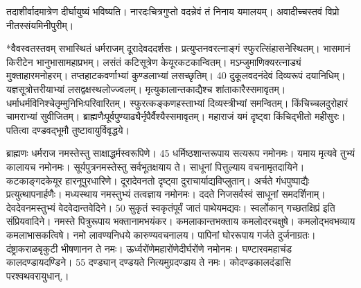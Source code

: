 तदाशीर्वादमात्रेण दीर्घायुष्यं भविष्यति।
 नारदःचित्रगुप्तो वदन्नेवं तं निनाय यमालयम्।
 अवादीच्चस्तवं विप्रो नीतस्संयमिनीपुरीम्।
 
*वैवस्वतस्तवम् सभास्थितं धर्मराजम् दूरादेवददर्शसः।
 प्रत्युप्तनवरत्नाङ्गं स्फुरत्सिंहासनेस्थितम्।
 भासमानं किरीटेन भानुभासामहाप्रभम्।
 लसंतं कटिसूत्रेण केयूरकटकान्वितम्।
 मऽम्जुमाणिक्यरत्नाड्यं मुक्ताहारमनोहरम्।
 तप्तहाटकवर्णाभ्यां कुण्डलाभ्यां लसच्छृतिम्।
 40 दुकूलवदनंदेवं दिव्यरूपं दयानिधिम्।
 यज्ञसूत्रोत्तरीयाभ्यां लसद्वक्षस्थलोज्ज्वलम्।
 मृत्युकालान्तकाद्यैश्च शांताकारैस्समावृतम्।
 धर्माधर्मविनिश्चेतृम्मुनिभिःपरिवारितम्।
 स्फुरत्कङ्कणहस्ताभ्यां दिव्यस्त्रीभ्यां समन्वितम्।
 किंचिच्चलदुरोहारं चामराभ्यां सुवीजितम्।
 ब्राह्मणैःपूर्वपुण्याढ्यैर्नृपैर्वैश्यैस्समावृतम्।
 महाराजं यमं दृष्ट्वा किंचिद्भीतो महीसुरः।
 पतित्वा दण्डवद्भूमौ तुष्टावायुर्विवृद्धये।
 
ब्राह्मणः
धर्मराज नमस्तेस्तु साक्षाद्धर्मस्वरूपिणे।
45
धर्मिष्ठशान्तरूपाय सत्यरूप नमोनमः।
 यमाय मृत्यवे तुभ्यं कालायच नमोनमः।
 सूर्यपुत्रनमस्तेस्तु सर्वभूतक्षयाय ते।
 साधूनां पित्तुल्याय वचनामृतदायिने।
 कटकाङ्गदकेयूर हारनूपुरधारिणे।
 दूरादेवनतो दृष्ट्वा दुराचार्याद्यविप्लुतान्।
 अर्चते गंधपुष्पाद्यैः प्रत्युत्थापनार्हणैः।
 मध्यस्थाय नमस्तुभ्यं तत्वज्ञाय नमोनमः।
 ददते निजसर्वस्वं साधूनां समदर्शिनाम्।
 देवदेवनमस्तुभ्यं वेदवेदान्तवेदिने।
 50 सुकृतं स्वकृतंपूर्वं जातं पाथेयमद्यवः।
 स्वर्लोकान् गच्छतक्षिप्रं इति संप्रियवादिने।
 नमस्ते पित्रुरूपाय भक्तानामभयंकर।
 कमलाकान्तभक्ताय कमलोदरचक्षुषे।
 कमलोद्भवभव्याय कमलाभासकत्विषे।
 नमो लावण्यनिधये कारुण्यवचनालय।
 पापिनां घोररूपाय गर्जते दुर्जनाग्रतः।
 दंष्ट्राकराळबृकुटी भीषणानन ते नमः।
 ऊर्ध्वरोंणेमहारोंणेदीर्घरोंणे नमोनमः।
 घण्टारवमहाचंड कालदण्डायदण्डिने।
 55 दण्ड्यान् दण्डयते नित्यमुग्रदण्डाय ते नमः।
 कोदण्डकालदंडासि परश्वथवरायुधान्,।
 
